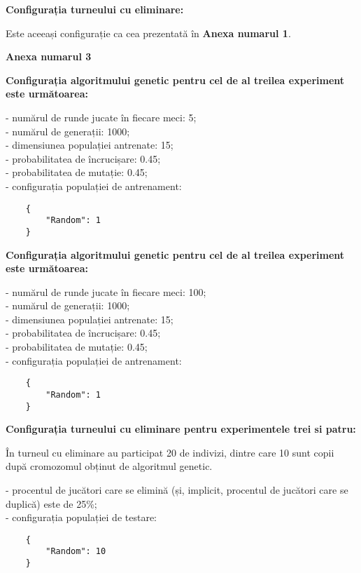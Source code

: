 \textbf{Configurația turneului cu eliminare: }

Este aceeași configurație ca cea prezentată în \textbf{Anexa numarul 1}.

\clearpage

\begin{center}
	\textbf{Anexa numarul 3}
\end{center}

\textbf{Configurația algoritmului genetic pentru cel de al treilea experiment este următoarea: }

- numărul de runde jucate în fiecare meci: 5;\\
- numărul de generații: 1000;\\
- dimensiunea populației antrenate: 15;\\
- probabilitatea de încrucișare: 0.45;\\
- probabilitatea de mutație: 0.45;\\
- configurația populației de antrenament:\\
\begin{center}
	\begin{lstlisting}
	{
		"Random": 1
	}
	\end{lstlisting}
\end{center}

\textbf{Configurația algoritmului genetic pentru cel de al treilea experiment este următoarea: }

- numărul de runde jucate în fiecare meci: 100;\\
- numărul de generații: 1000;\\
- dimensiunea populației antrenate: 15;\\
- probabilitatea de încrucișare: 0.45;\\
- probabilitatea de mutație: 0.45;\\
- configurația populației de antrenament:\\
\begin{center}
	\begin{lstlisting}
	{
		"Random": 1
	}
	\end{lstlisting}
\end{center}

\textbf{Configurația turneului cu eliminare pentru experimentele trei si patru: }

În turneul cu eliminare au participat 20 de indivizi, dintre care 10 sunt copii după cromozomul obținut de algoritmul genetic. 

- procentul de jucători care se elimină (și, implicit, procentul de jucători care se duplică) este de 25\%;\\
- configurația populației de testare:\\
\begin{center}
	\begin{lstlisting}
	{
		"Random": 10
	}
	\end{lstlisting}
\end{center}

\clearpage